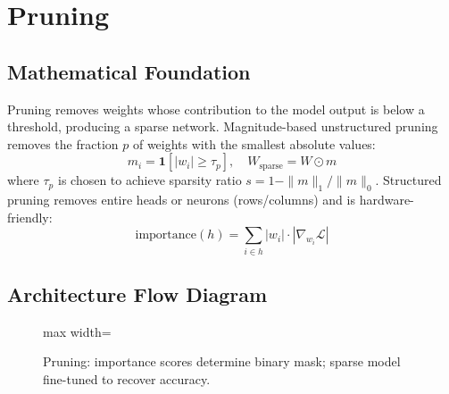 \newpage
\section{Pruning}

\subsection{Mathematical Foundation}
Pruning removes weights whose contribution to the model output is below a threshold, producing a sparse network. Magnitude-based unstructured pruning removes the fraction $p$ of weights with the smallest absolute values:
\begin{equation}
  m_i = \mathbf{1}[|w_i| \geq \tau_p],\quad W_{\text{sparse}} = W \odot m
\end{equation}
where $\tau_p$ is chosen to achieve sparsity ratio $s = 1 - \|m\|_1 / \|m\|_0$. Structured pruning removes entire heads or neurons (rows/columns) and is hardware-friendly:
\begin{equation}
  \text{importance}(h) = \sum_{i \in h} |w_i| \cdot |\nabla_{w_i}\mathcal{L}|
\end{equation}

\subsection{Architecture Flow Diagram}

\begin{figure}[h]
\centering
\begin{adjustbox}{max width=\linewidth}
\end{adjustbox}
\caption{Pruning: importance scores determine binary mask; sparse model fine-tuned to recover accuracy.}
\end{figure}

